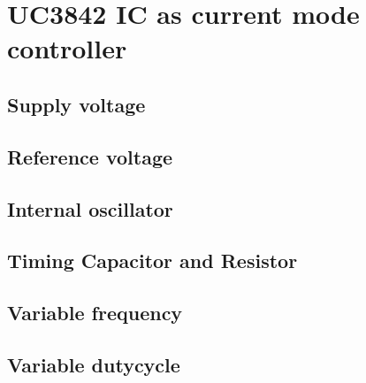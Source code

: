 \section{UC3842 IC as current mode controller}
\subsection{Supply voltage}
\subsection{Reference voltage}
\subsection{Internal oscillator}
\subsection{Timing Capacitor and Resistor}
\subsection{Variable frequency}
\subsection{Variable dutycycle}